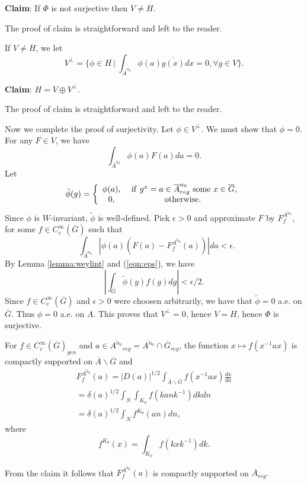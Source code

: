 \documentclass[twocolumn,10pt]{article}
\begin{document}
{\bf Claim}: 
If $\Phi$ is not surjective then $V\not= H$.

The proof of claim is straightforward and left to the reader.

If $V\not= H$, we let 
\[
V^\perp =
\{ \phi\in H\ |\ \int_{\overline{A}^{n_0}}
\phi(a)\overline{g(x)}dx=0, \forall g\in V
\}. 
\]

{\bf Claim}: $H=V\oplus V^\perp$.

The proof of claim is straightforward and left to the reader.

Now we complete the proof of surjectivity. 
Let $\phi \in V^{\perp }$. We
must show that $\phi =0$. For any $F\in V$, 
we have 
\[
\int_{\overline{A}^{n_0}}\phi (a)F(a)da=0.
\]
Let 
\[
\tilde \phi (g)=\left\{ 
\begin{array}{cc}
\phi (a),& {\rm \ if\ }g^x=
a\in \overline{A}^{n_0}_{reg}{\rm \ some\ }x\in \overline{G}, \\ 
0,& {\rm otherwise}.
\end{array}
\right. 
\]
Since $\phi$ is $W$-invariant, $\tilde{\phi}$ is well-defined.
Pick $\epsilon >0$ and approximate 
$F$ by $F_f^{\overline{A^{n_0}}}$, for some 
$f\in C_c^\infty (\overline{G})$
such that 
\begin{equation}
\ \ \ \int_{\overline{A}^{n_0}}
|\phi (a)(F(a)-F_f^{\overline{A^{n_0}}}(a))|da<\epsilon .  
\label{eqn:eps}
\end{equation}
By Lemma \ref{lemma:weylint} and 
(\ref{eqn:eps}), we have 
\[
|\int_{\overline{G}}\tilde \phi (g)f(g)dg|<\epsilon /2.
\]
Since $f\in C_c^\infty (\overline{G})$ 
and $\epsilon >0$ were choosen arbitrarily, we
have that $\tilde \phi =0$ a.e. on $\overline{G}$. 
Thus $\phi =0$ a.e. on $A$.
This proves that $V^{\perp }=0$, hence 
$V=H$, hence $\Phi $ is surjective.

For $f\in C_c^\infty (\overline{G})_{gen}$ and
$a\in \overline{A^{n_0}}_{reg}
=\overline{A^{n_0}}\cap \overline{G}_{reg}$, the
function $x\longmapsto f(x^{-1}ax)$ is compactly supported on
$\overline{A}\backslash \overline{G}$ and 
\[
\begin{array}{c}
F_f^{\overline{A^{n_0}}}(a)=|D(a)|^{1/2}
\int_{\overline{A}\backslash \overline{G}}
f(x^{-1}ax)\frac{dx}{da} \\ 
=\delta (a)^{1/2}\int_N\int_{K_0}f(kank^{-1})dkdn \\ 
=\delta (a)^{1/2}\int_Nf^{K_0}(an)dn,
\end{array}
\]
where 
\[
f^{K_0}(x)=\int_{K_0}f(kxk^{-1})dk.
\]

From the claim it 
follows that $F_f^{\overline{A^{n_0}}}(a)$ is
compactly supported on $\overline{A}_{reg}.$
\end{document}
